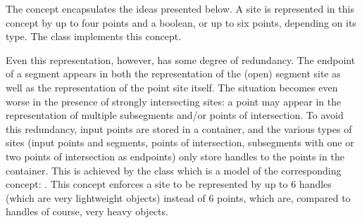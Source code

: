 The  concept encapsulates the ideas
presented below. A site is represented in this concept by up to four
points and a boolean, or up to six points, depending on its type. The
class  implements this
concept.


Even this representation, however, has some degree of redundancy. The
endpoint of a segment appears in both the representation of the (open)
segment site as well as the representation of the point site
itself. The situation becomes even worse in the presence of strongly
intersecting sites: a 
point may appear in the representation of multiple subsegments and/or
points of intersection. To avoid this redundancy, input points are
stored in a container, and the various types of sites (input points
and segments, points of intersection, subsegments with one or two
points of intersection as endpoints) only store handles to the points
in the container. This is achieved by the
 class which is a
model of the corresponding concept:
. This concept enforces a site
to be represented by up to 6 handles (which are very lightweight
objects) instead of 6 points, which are, compared to handles of
course, very heavy objects.

